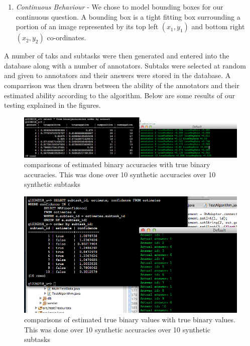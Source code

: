 \documentclass[11pt]{article}
\begin{document}
\begin{enumerate}
[3]
\item
\emph{Continuous Behaviour} - We chose to model bounding boxes for our continuous question. A bounding box is a tight fitting box surrounding
a portion of an image represented by its top left $(x_{1}, y_{1})$ and bottom right $(x_{2}, y_{2})$ co-ordinates. 


\end{enumerate}

A number of taks and subtasks were then generated and entered into the database along with a number of annotators. Subtaks were selected at random
and given to annotators and their answers were stored in the database. A comparrison was then drawn between the ability of the annotators and
their estimated ability according to the algorithm. Below are some results of our testing explained in the figures. 


\begin{figure}[H]
\begin{center}
\includegraphics[width=\linewidth]{images/test1.png}
\caption{comparisons of estimated binary accuracies with true binary accuracies. This was done over 10 synthetic accuracies over 10 synthetic subtasks}
\label{default}
\end{center}
\end{figure}


\begin{figure}[H]
\begin{center}
\includegraphics[width=\linewidth]{images/test2.png}
\caption{comparisons of estimated true binary values with true binary values. This was done over 10 synthetic accuracies over 10 synthetic subtasks}
\label{default}
\end{center}
\end{figure}
\end{document}
